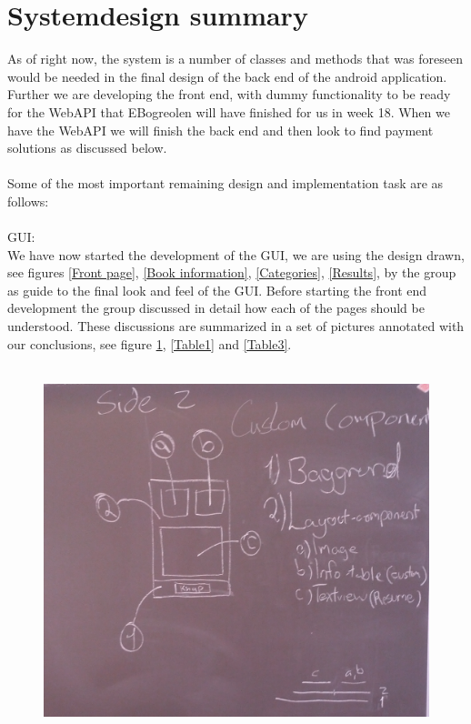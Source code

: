 \message{ !name(Rapport.tex)}\documentclass[12pt]{article}
\begin{document}
\section{Systemdesign summary}
\label{sec:Syssum}
As of right now, the system is a number of classes and methods that was foreseen would be needed in the final design of the back end of the android application. Further we are developing the front end, with dummy functionality to be ready for the WebAPI that EBogreolen will have finished for us in week 18. When we have the WebAPI we will finish the back end and then look to find payment solutions as discussed below.
\\\\
Some of the most important remaining design and implementation task are as follows:
\\\\
GUI:\\
We have now started the development of the GUI, we are using the design drawn, see figures \ref{Front page}, \ref{Book information}, \ref{Categories}, \ref{Results}, by the group as guide to the final look and feel of the GUI. Before starting the front end development the group discussed in detail how each of the pages should be understood. These discussions are summarized in a set of pictures annotated with our conclusions, see figure \ref{Table0}, \ref{Table1} and \ref{Table3}.
\\\\
\begin{figure}
 \includegraphics[scale=0.2]{Tavle}
\caption{ }
\label{Table0}
\end{figure}
\end{document}
